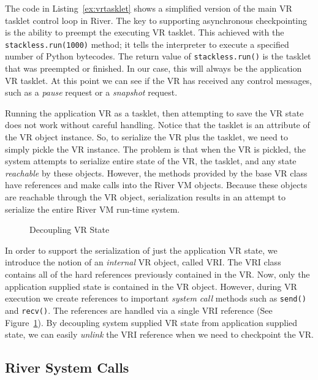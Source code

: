 The code in Listing~\ref{ex:vrtasklet} shows a simplified version of the
main VR tasklet control loop in River.  The key to supporting asynchronous
checkpointing is the ability to preempt the executing VR tasklet.  This
achieved with the \verb+stackless.run(1000)+ method; it tells the
interpreter to execute a specified number of Python bytecodes.  The return
value of \verb+stackless.run()+ is the tasklet that was preempted or finished.  In our case, this will always be the application VR tasklet.  At this point we can see if the VR has received any control messages, such as a {\it pause} request or a {\it snapshot} request.

Running the application VR as a tasklet, then attempting to save
the VR state does not work without careful handling. Notice that the
tasklet is an attribute of the VR object instance. So, to serialize the
VR plus the tasklet, we need to simply pickle the VR instance. The
problem is that when the VR is pickled, the system attempts to
serialize entire state of the VR, the tasklet, and any state {\it
reachable} by these objects. However, the methods provided by the base VR
class have references and make calls into the River VM objects. Because
these objects are reachable through the VR object, serialization results
in an attempt to serialize the entire River VM run-time system.

\begin{figure}[htb]
\centering{}
\caption{Decoupling VR State}\label{fig:river-decoupled-vr}
\end{figure}

In order to support the serialization of just the application VR state,
we introduce the notion of an {\it internal} VR object, called VRI. The
VRI class contains all of the hard references previously contained in
the VR. Now, only the application supplied state is contained in the VR
object. However, during VR execution we create references to important
{\it system call} methods such as \verb+send()+ and \verb+recv()+. The
references are handled via a single VRI reference (See
Figure~\ref{fig:river-decoupled-vr}). By decoupling system supplied VR
state from application supplied state, we can easily {\it unlink} the
VRI reference when we need to checkpoint the VR.

\subsection{River System Calls}

